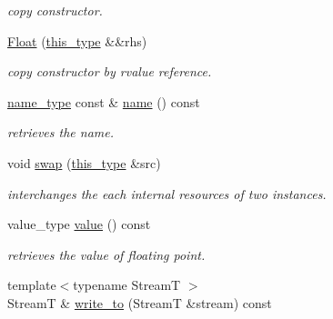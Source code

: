 \begin{DoxyCompactItemize}
\begin{DoxyCompactList}\small\item\em copy constructor. \end{DoxyCompactList}\item 
\hypertarget{classhryky_1_1reduction_1_1_float_a84e2252792cb6d471529ec444b00cdb9}{\hyperlink{classhryky_1_1reduction_1_1_float_a84e2252792cb6d471529ec444b00cdb9}{Float} (\hyperlink{classhryky_1_1reduction_1_1_base_af02a7dee6042080b7380afd2f9500a42}{this\-\_\-type} \&\&rhs)}\label{classhryky_1_1reduction_1_1_float_a84e2252792cb6d471529ec444b00cdb9}

\begin{DoxyCompactList}\small\item\em copy constructor by rvalue reference. \end{DoxyCompactList}\item 
\hypertarget{classhryky_1_1reduction_1_1_base_a842569265d741905eb8a353d3935f1d1}{\hyperlink{namespacehryky_1_1reduction_ac686c30a4c8d196bbd0f05629a6b921f}{name\-\_\-type} const \& \hyperlink{classhryky_1_1reduction_1_1_base_a842569265d741905eb8a353d3935f1d1}{name} () const }\label{classhryky_1_1reduction_1_1_base_a842569265d741905eb8a353d3935f1d1}

\begin{DoxyCompactList}\small\item\em retrieves the name. \end{DoxyCompactList}\item 
\hypertarget{classhryky_1_1reduction_1_1_float_adf0505497af06bc65bcc3e24e6a5fd45}{void \hyperlink{classhryky_1_1reduction_1_1_float_adf0505497af06bc65bcc3e24e6a5fd45}{swap} (\hyperlink{classhryky_1_1reduction_1_1_base_af02a7dee6042080b7380afd2f9500a42}{this\-\_\-type} \&src)}\label{classhryky_1_1reduction_1_1_float_adf0505497af06bc65bcc3e24e6a5fd45}

\begin{DoxyCompactList}\small\item\em interchanges the each internal resources of two instances. \end{DoxyCompactList}\item 
\hypertarget{classhryky_1_1reduction_1_1_float_aa172d53821cd26856950b10f67ca658b}{value\-\_\-type \hyperlink{classhryky_1_1reduction_1_1_float_aa172d53821cd26856950b10f67ca658b}{value} () const }\label{classhryky_1_1reduction_1_1_float_aa172d53821cd26856950b10f67ca658b}

\begin{DoxyCompactList}\small\item\em retrieves the value of floating point. \end{DoxyCompactList}\item 
\hypertarget{classhryky_1_1reduction_1_1_base_a709cc7c48e1c90fe253739e46d82aa19}{{\footnotesize template$<$typename Stream\-T $>$ }\\Stream\-T \& \hyperlink{classhryky_1_1reduction_1_1_base_a709cc7c48e1c90fe253739e46d82aa19}{write\-\_\-to} (Stream\-T \&stream) const }\label{classhryky_1_1reduction_1_1_base_a709cc7c48e1c90fe253739e46d82aa19}


\end{DoxyCompactItemize}
